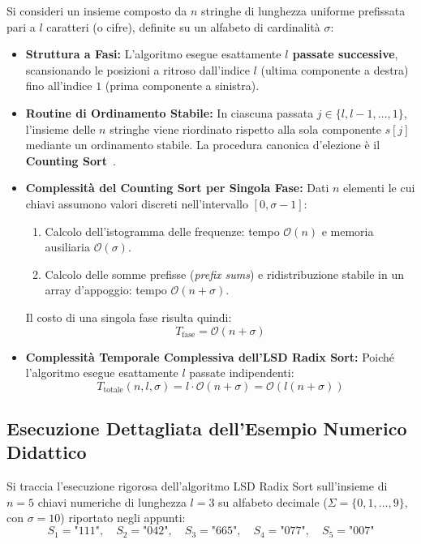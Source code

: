 Si consideri un insieme composto da $n$ stringhe di lunghezza uniforme prefissata pari a $l$ caratteri (o cifre), definite su un alfabeto di cardinalit\`a $\sigma$:
\begin{itemize}
  \item \textbf{Struttura a Fasi:} L'algoritmo esegue esattamente \textbf{$l$ passate successive}, scansionando le posizioni a ritroso dall'indice $l$ (ultima componente a destra) fino all'indice $1$ (prima componente a sinistra).
  \item \textbf{Routine di Ordinamento Stabile:} In ciascuna passata $j \in \{l, l-1, \dots, 1\}$, l'insieme delle $n$ stringhe viene riordinato rispetto alla sola componente $s[j]$ mediante un ordinamento stabile. La procedura canonica d'elezione \`e il \textbf{Counting Sort}~\cite{knuth1998vol3}.
  \item \textbf{Complessit\`a del Counting Sort per Singola Fase:}
  Dati $n$ elementi le cui chiavi assumono valori discreti nell'intervallo $[0, \sigma - 1]$:
  \begin{enumerate}
    \item Calcolo dell'istogramma delle frequenze: tempo $\mathcal{O}(n)$ e memoria ausiliaria $\mathcal{O}(\sigma)$.
    \item Calcolo delle somme prefisse (\textit{prefix sums}) e ridistribuzione stabile in un array d'appoggio: tempo $\mathcal{O}(n + \sigma)$.
  \end{enumerate}
  Il costo di una singola fase risulta quindi:
  \begin{equation}
    T_{\text{fase}} = \mathcal{O}(n + \sigma)
  \end{equation}
  \item \textbf{Complessit\`a Temporale Complessiva dell'LSD Radix Sort:}
  Poich\'e l'algoritmo esegue esattamente $l$ passate indipendenti:
  \begin{equation}
    T_{\text{totale}}(n, l, \sigma) = l \cdot \mathcal{O}(n + \sigma) = \mathcal{O}(l(n + \sigma))
  \end{equation}
\end{itemize}

\FloatBarrier
\subsection{Esecuzione Dettagliata dell'Esempio Numerico Didattico}
\label{subsec:esempio-numerico-lsd}

Si traccia l'esecuzione rigorosa dell'algoritmo LSD Radix Sort sull'insieme di $n = 5$ chiavi numeriche di lunghezza $l = 3$ su alfabeto decimale ($\Sigma = \{0, 1, \dots, 9\}$, con $\sigma = 10$) riportato negli appunti:
\begin{equation}
  S_1 = \text{"111"}, \quad S_2 = \text{"042"}, \quad S_3 = \text{"665"}, \quad S_4 = \text{"077"}, \quad S_5 = \text{"007"}
\end{equation}

